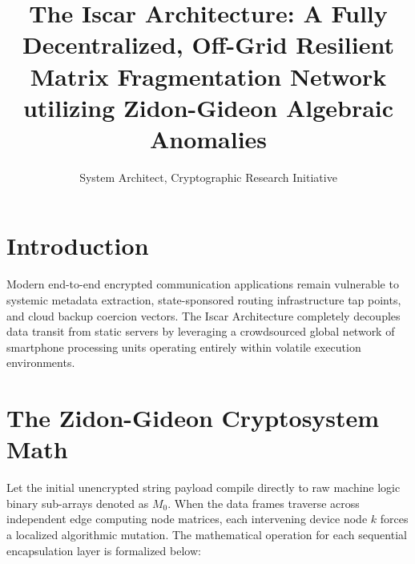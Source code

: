 \documentclass[10pt,journal,compsoc]{IEEEtran}
\begin{document}
\title{The Iscar Architecture: A Fully Decentralized, Off-Grid Resilient Matrix Fragmentation Network utilizing Zidon-Gideon Algebraic Anomalies}

\author{System Architect, Cryptographic Research Initiative}


\maketitle
\IEEEdisplaynontitleabstractindextext
\IEEEpeerreviewmaketitle

\section{Introduction}
Modern end-to-end encrypted communication applications remain vulnerable to systemic metadata extraction, state-sponsored routing infrastructure tap points, and cloud backup coercion vectors. The Iscar Architecture completely decouples data transit from static servers by leveraging a crowdsourced global network of smartphone processing units operating entirely within volatile execution environments.

\section{The Zidon-Gideon Cryptosystem Math}
Let the initial unencrypted string payload compile directly to raw machine logic binary sub-arrays denoted as $M_0$. When the data frames traverse across independent edge computing node matrices, each intervening device node $k$ forces a localized algorithmic mutation. The mathematical operation for each sequential encapsulation layer is formalized below:
\end{document}
